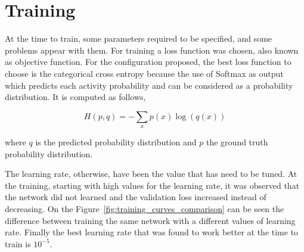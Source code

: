 \section{Training}
\label{section:training}

At the time to train, some parameters required to be specified, and some problems appear with them. For training a loss function was chosen, also known as objective function. For the configuration proposed, the best loss function to choose is the categorical cross entropy because the use of Softmax as output which predicts each activity probability and can be considered as a probability distribution. It is computed as follows,

\begin{equation}
	H(p,q) = - \sum_x p(x) \log(q(x))
\end{equation}

where $q$ is the predicted probability distribution and $p$ the ground truth probability distribution.

The learning rate, otherwise, have been the value that has need to be tuned. At the training, starting with high values for the learning rate, it was observed that the network did not learned and the validation loss increased instead of decreasing. On the Figure~\ref{fig:training_curves_comparison} can be seen the difference between training the same network with a different values of learning rate. Finally the best learning rate that was found to work better at the time to train is $10^{-5}$.

